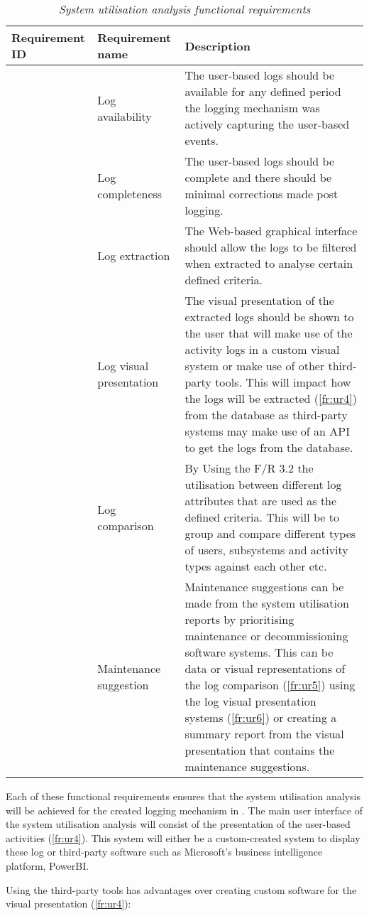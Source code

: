 \setcounter{phase}{3}
\setcounter{subphase}{0}
\begin{table}[!htb]
	\centering
	\caption[System utilisation analysis functional requirements]
	{\textit{System utilisation analysis functional requirements}}
	\label{tbl:ch2_utilisation_requirements}
	\begin{tabularx}{\textwidth}{|l|l|X|}
		\hline \textbf{Requirement ID} & \textbf{Requirement name} & \textbf{Description} \\
		\hline \subphase{fr:ur1} & Log availability & \RaggedRight The user-based logs should be available for any defined period the logging mechanism was actively capturing the user-based events. \\
		\hline \subphase{fr:ur2} & Log completeness & \RaggedRight The user-based logs should be complete and there should be minimal corrections made post logging. \\
		\hline \subphase{fr:ur3} & Log extraction & \RaggedRight The Web-based graphical interface should allow the logs to be filtered when extracted to analyse certain defined criteria. \\
		\hline \subphase{fr:ur4} & Log visual presentation & The visual presentation of the extracted logs should be shown to the user that will make use of the activity logs in a custom visual system or make use of other third-party tools. This will impact how the logs will be extracted (\ref{fr:ur4}) from the database as third-party systems may make use of an API to get the logs from the database. \\
		\hline \subphase{fr:ur5} & Log comparison & \RaggedRight By Using the F/R 3.2 the utilisation between different log attributes that are used as the defined criteria. This will be to group and compare different types of users, subsystems and activity types against each other etc.\\
		\hline \subphase{fr:ur6} & \RaggedRight Maintenance suggestion & Maintenance suggestions can be made from the system utilisation reports by prioritising maintenance or decommissioning software systems. This can be data or visual representations of the log comparison (\ref{fr:ur5}) using the log visual presentation systems (\ref{fr:ur6}) or creating a summary report from the visual presentation that contains the maintenance suggestions. \\
		\hline
	\end{tabularx}
\end{table}

Each of these functional requirements ensures that the system utilisation analysis will be achieved for the created logging mechanism in . The main user interface of the system utilisation analysis will consist of the presentation of the user-based activities (\ref{fr:ur4}). This system will either be a custom-created system to display these log or third-party software such as Microsoft's business intelligence platform, PowerBI. \par Using the third-party tools has advantages over creating custom software for the visual presentation (\ref{fr:ur4}):

